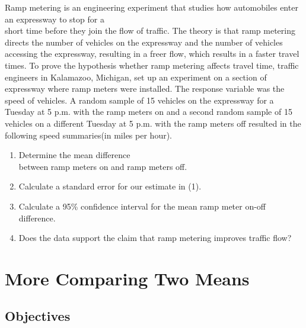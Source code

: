 \documentclass[11pt, chapterprefix=true]{scrbook}\usepackage[]{graphicx}\usepackage[]{color}
\begin{document}
\begin{exercises}
\begin{exercise}
Ramp metering is an engineering experiment that studies how automobiles enter an expressway to stop for a \\ short time before they join the flow of traffic.  The theory is that ramp metering  directs the number of vehicles on the expressway and the  number of vehicles accessing the expressway, resulting in a freer flow, which results in a faster travel times.  To prove the hypothesis whether ramp metering affects travel time, traffic engineers in Kalamazoo, Michigan, set up an experiment on a section of expressway where ramp meters were installed.  The response variable was the speed of vehicles.  A random sample of 15 vehicles on the expressway for a Tuesday at 5 p.m. with the ramp meters on and a second random sample of 15 vehicles on a different Tuesday at 5 p.m. with the ramp meters off resulted in the following speed summaries(in miles per hour).

\begin{enumerate}
  \item Determine the mean difference \\ between ramp meters on and ramp meters off.
  \item Calculate a standard error for our estimate in (1).
  \item Calculate a 95\% confidence interval for the mean ramp meter on-off difference.
  \item Does the data support the claim that ramp metering improves traffic flow?
\end{enumerate}


\end{exercise}
\begin{solution}  %


\end{solution}


\end{exercises}


\onecolumn












\chapter{More Comparing Two Means}
\label{chap:ch13}

\section{Objectives}
\end{document}
